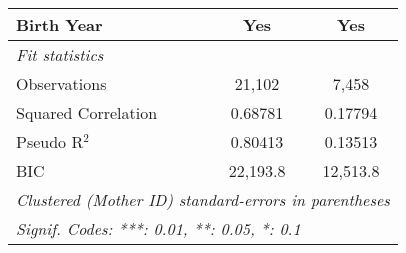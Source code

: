\documentclass{article}
\begin{document}
\begin{tabular}{lcc}
   Birth Year          & Yes             & Yes\\  
   \midrule
   \emph{Fit statistics}\\
   Observations        & 21,102          & 7,458\\  
   Squared Correlation & 0.68781         & 0.17794\\  
   Pseudo R$^2$        & 0.80413         & 0.13513\\  
   BIC                 & 22,193.8        & 12,513.8\\  
   \midrule \midrule
   \multicolumn{3}{l}{\emph{Clustered (Mother ID) standard-errors in parentheses}}\\
   \multicolumn{3}{l}{\emph{Signif. Codes: ***: 0.01, **: 0.05, *: 0.1}}\\
\end{tabular}
\par\endgroup
\end{document}
